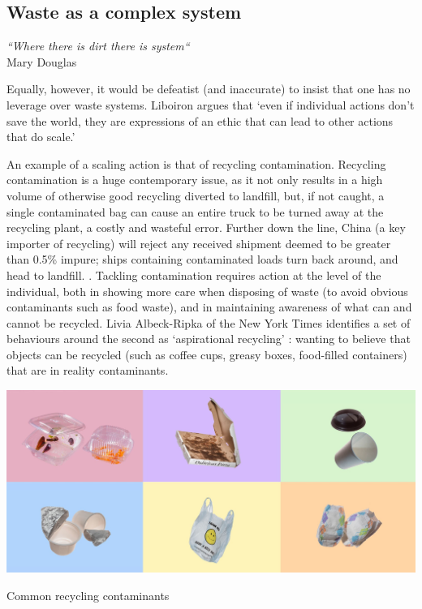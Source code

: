 \documentclass[nofonts,nols,justified,nobib]{tufte-book}
\begin{document}
\subsection*{Waste as a complex system}

\begin{flushright}
\begin{flushright}
\emph{``Where there is dirt there is system``} \cite{douglas_purity_1966}\\
Mary Douglas 
\end{flushright}
\end{flushright}

Equally, however, it would be defeatist (and inaccurate) to insist that one has no leverage over waste systems. Liboiron argues that `even if individual actions don't save the world, they are expressions of an ethic that can lead to other actions that do scale.'\cite{liboiron_against_2014}

An example of a scaling action is that of recycling contamination. Recycling contamination is a huge contemporary issue, as it not only results in a high volume of otherwise good recycling diverted to landfill, but, if not caught, a single contaminated bag can cause an entire truck to be turned away at the recycling plant, a costly and wasteful error. Further down the line, China (a key importer of recycling) will reject any received shipment deemed to be greater than 0.5\% impure; ships containing contaminated loads turn back around, and head to landfill. \cite{albeck-ripka_your_2018}. Tackling contamination requires action at the level of the individual, both in showing more care when disposing of waste (to avoid obvious contaminants such as food waste), and in maintaining awareness of what can and cannot be recycled. Livia Albeck-Ripka of the New York Times identifies a set of behaviours around the second as `aspirational recycling' \cite{albeck-ripka_6_2018}: wanting to believe that objects can be recycled (such as coffee cups, greasy boxes, food-filled containers) that are in reality contaminants. 

\begin{marginfigure}
\includegraphics[width=\textwidth]{img/1/contaminants.jpg}
\caption{Common recycling contaminants \cite{albeck-ripka_6_2018} \label{b}}
\end{marginfigure}
\end{document}
